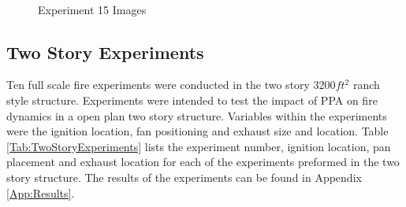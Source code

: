 \documentclass{article}
\begin{document}
\begin{figure}[H]
	\ContinuedFloat 
	\centering 
	 \ 
	\caption{Experiment 15 Images}
	\label{fig:Experiment15ImagesCont3} 
\end{figure}

\subsection{Two Story Experiments} \label{TwoStoryExp}

Ten full scale fire experiments were conducted in the two story 3200$ft^2$ ranch style structure. Experiments were intended to test the impact of PPA on fire dynamics in a open plan two story structure. Variables within the experiments were the ignition location, fan positioning and exhaust size and location. Table \ref{Tab:TwoStoryExperiments} lists the experiment number, ignition location, pan placement and exhaust location for each of the experiments preformed in the two story structure. The results of the experiments can be found in Appendix \ref{App:Results}. 
\end{document}
